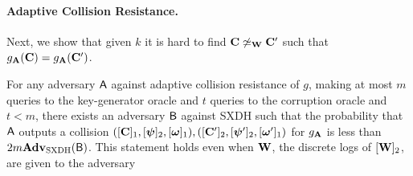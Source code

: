 \paragraph{Adaptive Collision Resistance.}
Next, we show that given $k$  it is hard to find $\mathbf{{C}}\not\simeq_{\mathbf{{W}}} \mathbf{{C}}'$ such that $g_{\mathbf{{A}}}(\mathbf{{C}})=g_{\mathbf{{A}}}(\mathbf{{C}}')$.
%
\begin{lemma} \label{lemma:g-cr-sxdh}
For any adversary $\mathsf{A}$ against adaptive collision resistance of $g$, making at most $m$  queries to the key-generator oracle and $t$ queries to the corruption oracle and $t<m$, there exists an adversary $\mathsf{B}$ against SXDH such that the probability that $\mathsf{A}$ outputs a collision $([\mathbf{{C}}]_1,[{\boldsymbol{\psi}}]_2,[{\boldsymbol{\omega}}]_1),([\mathbf{{C}}']_2,[{\boldsymbol{\psi}}']_2,[{\boldsymbol{\omega}}']_1)$ for $g_{\mathbf{{A}}}$  is less than $2m \mathbf{Adv}_{\mathrm{SXDH}}(\mathsf{B})$. This statement holds even when $\mathbf{{W}}$, the discrete logs of $[\mathbf{{W}}]_2$, are given to the adversary 
\end{lemma}

